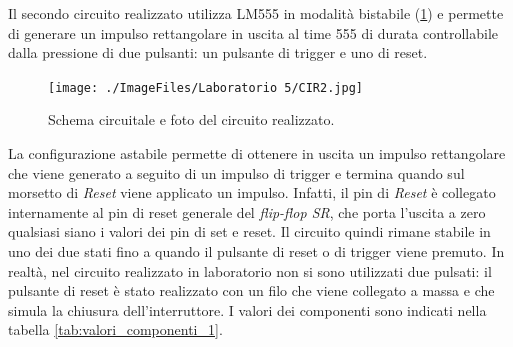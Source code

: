 \clearpage
Il secondo circuito realizzato utilizza LM555 in modalità bistabile (\Fig\ref{fig:circuito_2}) e permette di generare un impulso rettangolare in uscita al time 555 di durata controllabile dalla pressione di due pulsanti: un pulsante di trigger e uno di reset.
\begin{figure}[h!]
	\centering
	\begin{minipage}{.45\textwidth}
	\end{minipage}\qquad
	\begin{minipage}{.45\textwidth}
		\texttt{[image: ./ImageFiles/Laboratorio 5/CIR2.jpg]}
	\end{minipage}
	\caption{Schema circuitale e foto del circuito realizzato.}
	\label{fig:circuito_2}
\end{figure}
\noindent
La configurazione astabile permette di ottenere in uscita un impulso rettangolare che viene generato a seguito di un impulso di trigger e termina quando sul morsetto di \textit{Reset} viene applicato un impulso. Infatti, il pin di \textit{Reset} è collegato internamente al pin di reset generale del \textit{flip-flop SR}, che porta l'uscita a zero qualsiasi siano i valori dei pin di set e reset. Il circuito quindi rimane stabile in uno dei due stati fino a quando il pulsante di reset o di trigger viene premuto. In realtà, nel circuito realizzato in laboratorio non si sono utilizzati due pulsati: il pulsante di reset è stato realizzato con un filo che viene collegato a massa e che simula la chiusura dell'interruttore. I valori dei componenti sono indicati nella tabella \ref{tab:valori_componenti_1}.
